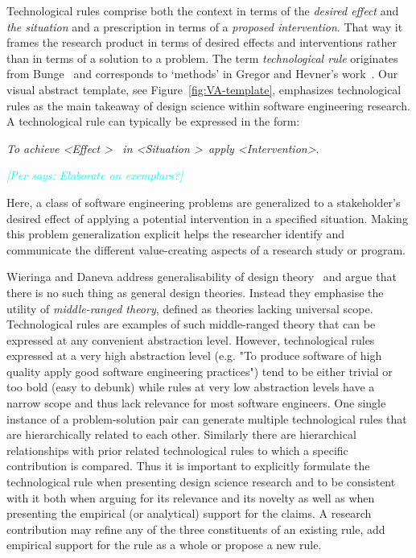 \documentclass[graybox]{svmult}
\newcommand{\per}[1]{\textcolor{cyan}{{\it [Per says: #1]}}}
\newcommand{\per}[1]{}
\begin{document}
Technological rules comprise both the context in terms of the \emph{desired effect} and \emph{the situation} and a prescription in terms of a \emph{proposed intervention}. That way it frames the research product in terms of desired effects and interventions rather than in terms of a solution to a problem. The term \emph{technological rule} originates from Bunge~\cite{bunge_philosophy_1998} and corresponds to `methods' in Gregor and Hevner's work~\cite{gregor_positioning_2013}. Our visual abstract template,  see Figure~\ref{fig:VA-template}, emphasizes technological rules as the main takeaway of design science within software engineering research. A technological rule can typically be expressed in the form: 

\begin{center}{\emph{To achieve \textless Effect \textgreater ~ in \textless Situation \textgreater~apply \textless Intervention\textgreater}.} 
\newline
\end{center}

 \per{Elaborate on exemplars?} 

Here, a class of software engineering problems are generalized to a stakeholder's desired effect of applying a potential intervention in a specified situation. 
Making this problem generalization explicit helps the researcher identify and communicate the different value-creating aspects of a research study or program.



Wieringa and Daneva address generalisability of design theory~\cite{wieringa_six_2015} and argue that there is no such thing as general design theories. Instead they emphasise the utility of \emph{middle-ranged theory}, defined as theories lacking universal scope. 
Technological rules are examples of such middle-ranged theory that can be expressed at any convenient abstraction level. However, technological rules expressed at a very high abstraction level (e.g. "To produce software of high quality apply good software engineering practices") tend to be either trivial or too bold (easy to debunk) while rules at very low abstraction levels have a narrow scope and thus lack relevance for most software engineers. One single instance of a problem-solution pair can generate multiple technological rules that are hierarchically related to each other. Similarly there are hierarchical relationships with prior related technological rules to which a specific contribution is compared.
Thus it is important to explicitly formulate the technological rule when presenting design science research and to be consistent with it both when arguing for its relevance and its novelty as well as when presenting the empirical (or analytical) support for the claims.  A research contribution may refine any of the three constituents of an existing rule, add empirical support for the rule as a whole or propose a new rule.
\end{document}
